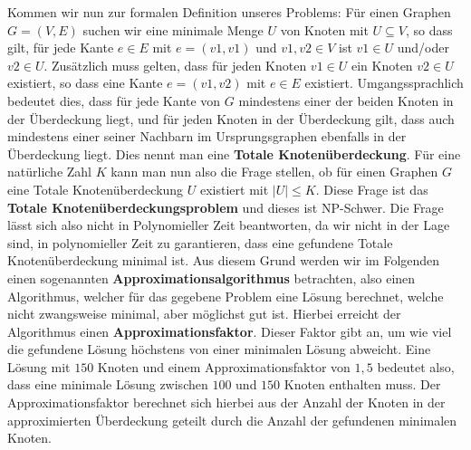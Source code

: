 \documentclass[12pt,onecolumn, notitlepage]{scrartcl}
\begin{document}
Kommen wir nun zur formalen Definition unseres Problems:\newline
Für einen Graphen $G = (V,E)$ suchen wir eine minimale Menge $U$ von Knoten mit $U \subseteq V$, so dass gilt, für jede Kante $e \in E$ mit $e = (v1,v1)$ und $v1,v2 \in V$ ist $v1 \in U$ und/oder $v2 \in U$. Zusätzlich muss gelten, dass für jeden Knoten $v1 \in U$ ein Knoten $v2 \in U$ existiert, so dass eine Kante $e = (v1,v2)$ mit $e \in E$ existiert. Umgangssprachlich bedeutet dies, dass für jede Kante von $G$ mindestens einer der beiden Knoten in der Überdeckung liegt, und für jeden Knoten in der Überdeckung gilt, dass auch mindestens einer seiner Nachbarn im Ursprungsgraphen ebenfalls in der Überdeckung liegt. Dies nennt man eine \textbf{Totale Knotenüberdeckung}. \newline
Für eine natürliche Zahl $K$ kann man nun also die Frage stellen, ob für einen Graphen $G$ eine Totale Knotenüberdeckung $U$ existiert mit $|U| \leq K$. Diese Frage ist das \textbf{Totale Knotenüberdeckungsproblem} und dieses ist NP-Schwer. Die Frage lässt sich also nicht in Polynomieller Zeit beantworten, da wir nicht in der Lage sind, in polynomieller Zeit zu garantieren, dass eine gefundene Totale Knotenüberdeckung minimal ist. \newline
Aus diesem Grund werden wir im Folgenden einen sogenannten \textbf{Approximationsalgorithmus} betrachten, also einen Algorithmus, welcher für das gegebene Problem eine Lösung berechnet, welche nicht zwangsweise minimal, aber möglichst gut ist. Hierbei erreicht der Algorithmus einen \textbf{Approximationsfaktor}. Dieser Faktor gibt an, um wie viel die gefundene Lösung höchstens von einer minimalen Lösung abweicht. Eine Lösung mit $150$ Knoten und einem Approximationsfaktor von $1,5$ bedeutet also, dass eine minimale Lösung zwischen $100$ und $150$ Knoten enthalten muss.\newline
Der Approximationsfaktor berechnet sich hierbei aus der Anzahl der Knoten in der approximierten Überdeckung geteilt durch die Anzahl der gefundenen minimalen Knoten.\newline
\end{document}
